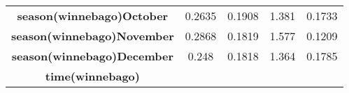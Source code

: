 \documentclass[]{book}
\theoremstyle{definition}
\theoremstyle{definition}
\theoremstyle{remark}
\begin{document}
\begin{longtable}[c]{@{}ccccc@{}}
\begin{minipage}[t]{0.37\columnwidth}
\textbf{season(winnebago)October}
\strut\end{minipage} &
\begin{minipage}[t]{0.12\columnwidth}\centering\strut
0.2635
\strut\end{minipage} &
\begin{minipage}[t]{0.14\columnwidth}\centering\strut
0.1908
\strut\end{minipage} &
\begin{minipage}[t]{0.11\columnwidth}\centering\strut
1.381
\strut\end{minipage} &
\begin{minipage}[t]{0.11\columnwidth}\centering\strut
0.1733
\strut\end{minipage}\tabularnewline
\begin{minipage}[t]{0.37\columnwidth}\centering\strut
\textbf{season(winnebago)November}
\strut\end{minipage} &
\begin{minipage}[t]{0.12\columnwidth}\centering\strut
0.2868
\strut\end{minipage} &
\begin{minipage}[t]{0.14\columnwidth}\centering\strut
0.1819
\strut\end{minipage} &
\begin{minipage}[t]{0.11\columnwidth}\centering\strut
1.577
\strut\end{minipage} &
\begin{minipage}[t]{0.11\columnwidth}\centering\strut
0.1209
\strut\end{minipage}\tabularnewline
\begin{minipage}[t]{0.37\columnwidth}\centering\strut
\textbf{season(winnebago)December}
\strut\end{minipage} &
\begin{minipage}[t]{0.12\columnwidth}\centering\strut
0.248
\strut\end{minipage} &
\begin{minipage}[t]{0.14\columnwidth}\centering\strut
0.1818
\strut\end{minipage} &
\begin{minipage}[t]{0.11\columnwidth}\centering\strut
1.364
\strut\end{minipage} &
\begin{minipage}[t]{0.11\columnwidth}\centering\strut
0.1785
\strut\end{minipage}\tabularnewline
\begin{minipage}[t]{0.37\columnwidth}\centering\strut
\textbf{time(winnebago)}

\end{minipage}
\end{longtable}
\end{document}
